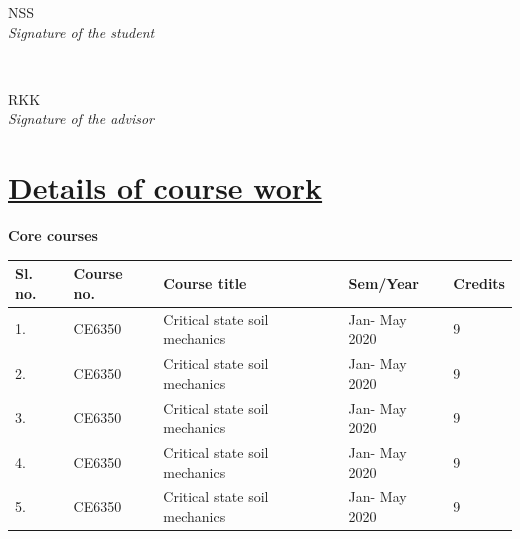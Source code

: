 \documentclass[12pt]{article}
\begin{document}
\vspace{18em}

\begin{minipage}{0.5\textwidth}
\begin{flushleft} \large
\textsc{NSS} \\
\emph{Signature of the student} 
\end{flushleft}
\end{minipage}
~
\begin{minipage}{0.4\textwidth}
\begin{flushright} \large
\textsc{RKK} \\
\emph{Signature of the advisor} 
\end{flushright}
\end{minipage}

\newpage
\centering
\section*{\LARGE \underline{Details of course work}}
\begin{flushleft} \large
\textbf{Core courses}
\end{flushleft}
\vspace{-1em}
\begin{table}[!htbp]
\setlength{\tabcolsep}{10pt} 
\renewcommand{\arraystretch}{1.5}
\begin{tabular}{|l|l|l|l|l|}
\hline
\textbf{Sl. no.} & \textbf{Course no.} & \textbf{Course title}         & \textbf{Sem/Year} & \textbf{Credits} \\ \hline
1.               & CE6350              & Critical state soil mechanics & Jan- May 2020     & 9                \\ \hline
2.               & CE6350              & Critical state soil mechanics & Jan- May 2020     & 9                \\ \hline
3.               & CE6350              & Critical state soil mechanics & Jan- May 2020     & 9                \\ \hline
4.               & CE6350              & Critical state soil mechanics & Jan- May 2020     & 9                \\ \hline
5.               & CE6350              & Critical state soil mechanics & Jan- May 2020     & 9                \\ \hline
\end{tabular}
\end{table}
\vspace{-1em}
\centering
\end{document}
